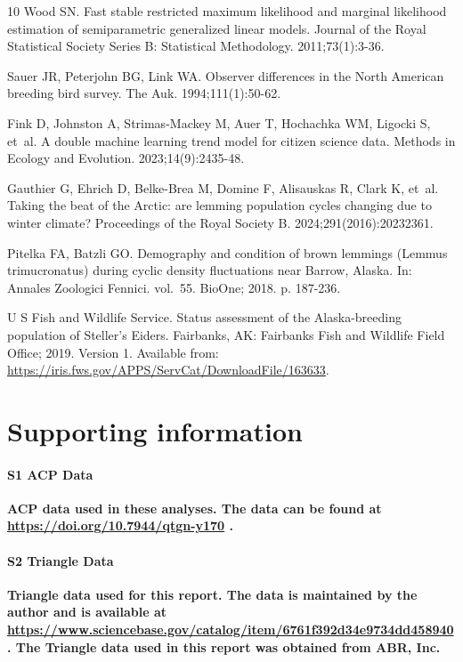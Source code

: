 \documentclass[
  10pt,
  letterpaper,
]{article}
\begin{document}
\begin{thebibliography}{10}
Wood SN.
\newblock Fast stable restricted maximum likelihood and marginal likelihood estimation of semiparametric generalized linear models.
\newblock Journal of the Royal Statistical Society Series B: Statistical Methodology. 2011;73(1):3-36.

Sauer JR, Peterjohn BG, Link WA.
\newblock Observer differences in the North American breeding bird survey.
\newblock The Auk. 1994;111(1):50-62.

Fink D, Johnston A, Strimas-Mackey M, Auer T, Hochachka WM, Ligocki S, et~al.
\newblock A double machine learning trend model for citizen science data.
\newblock Methods in Ecology and Evolution. 2023;14(9):2435-48.

Gauthier G, Ehrich D, Belke-Brea M, Domine F, Alisauskas R, Clark K, et~al.
\newblock Taking the beat of the Arctic: are lemming population cycles changing due to winter climate?
\newblock Proceedings of the Royal Society B. 2024;291(2016):20232361.

Pitelka FA, Batzli GO.
\newblock Demography and condition of brown lemmings (Lemmus trimucronatus) during cyclic density fluctuations near Barrow, Alaska.
\newblock In: Annales Zoologici Fennici. vol.~55. BioOne; 2018. p. 187-236.

{U S  Fish and Wildlife Service}.
\newblock Status assessment of the {Alaska-breeding} population of {Steller’s Eiders}.
\newblock Fairbanks, {AK}: Fairbanks Fish and Wildlife Field Office; 2019. Version 1.
\newblock Available from: \url{https://iris.fws.gov/APPS/ServCat/DownloadFile/163633}.

\end{thebibliography}


\section{Supporting information}\label{supporting-information}

\paragraph*{S1 ACP Data}
\label{s1-acpdata}
{\textbf{ACP data used in these analyses. The data can be found at
\url{https://doi.org/10.7944/qtgn-y170} \citep{osnasACP}.}}

\paragraph*{S2 Triangle Data}
\label{s2-tridata}
{\textbf{Triangle data used for this report. The data is maintained by
the author and is available at
\url{https://www.sciencebase.gov/catalog/item/6761f392d34e9734dd458940}.
The Triangle data used in this report was obtained from ABR, Inc.~}}
\end{document}
